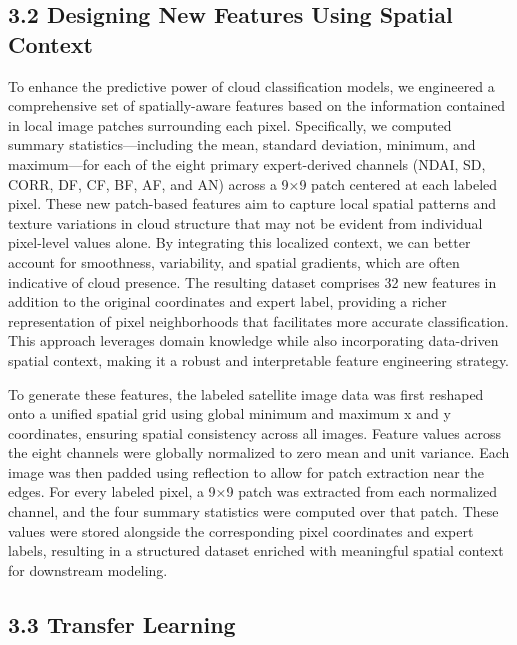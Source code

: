 \documentclass[11pt]{article}
\begin{document}
    \subsection*{3.2 Designing New Features Using Spatial
Context}\label{designing-new-features-using-spatial-context}

To enhance the predictive power of cloud classification models, we
engineered a comprehensive set of spatially-aware features based on the
information contained in local image patches surrounding each pixel.
Specifically, we computed summary statistics---including the mean,
standard deviation, minimum, and maximum---for each of the eight primary
expert-derived channels (NDAI, SD, CORR, DF, CF, BF, AF, and AN) across
a 9×9 patch centered at each labeled pixel. These new patch-based
features aim to capture local spatial patterns and texture variations in
cloud structure that may not be evident from individual pixel-level
values alone. By integrating this localized context, we can better
account for smoothness, variability, and spatial gradients, which are
often indicative of cloud presence. The resulting dataset comprises 32
new features in addition to the original coordinates and expert label,
providing a richer representation of pixel neighborhoods that
facilitates more accurate classification. This approach leverages domain
knowledge while also incorporating data-driven spatial context, making
it a robust and interpretable feature engineering strategy.

To generate these features, the labeled satellite image data was first
reshaped onto a unified spatial grid using global minimum and maximum x
and y coordinates, ensuring spatial consistency across all images.
Feature values across the eight channels were globally normalized to
zero mean and unit variance. Each image was then padded using reflection
to allow for patch extraction near the edges. For every labeled pixel, a
9×9 patch was extracted from each normalized channel, and the four
summary statistics were computed over that patch. These values were
stored alongside the corresponding pixel coordinates and expert labels,
resulting in a structured dataset enriched with meaningful spatial
context for downstream modeling.

    \subsection*{3.3 Transfer Learning}\label{transfer-learning}
\end{document}
